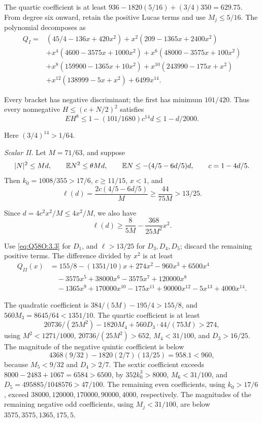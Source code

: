 The quartic coefficient is at least
\(936-1820(5/16)+(3/4)350=\allowbreak 629.75\).
From degree six onward, retain the positive Lucas terms and use \(M_j\le\allowbreak 5/16\).
The polynomial decomposes as
\[
\begin{aligned}
Q_I={}&(45/4-136x+420x^2)+x^2(209-1365x+2400x^2)\\
&+x^4(4600-3575x+1000x^2)+x^6(48000-3575x+100x^2)\\
&+x^8(159900-1365x+10x^2)+x^{10}(243990-175x+x^2)\\
&+x^{12}(138999-5x+x^2)+6499x^{14}.
\end{aligned}
\tag{Q58O.3.1}\label{eq:Q58O:3.1}
\]

Every bracket has negative discriminant; the first has minimum \(101/420\).
Thus every nonnegative \(H\le\allowbreak (c+N/2)^2\) satisfies
\[
EH^8\le1-(101/1680)c^{14}d\le1-d/2000.
\tag{Q58O.3.2}\label{eq:Q58O:3.2}
\]

Here \((3/4)^{14}>\allowbreak 1/64\).

\emph{Scalar II.}
Let \(M=\allowbreak 71/63\), and suppose
\[
|N|^2\le Md,\qquad \mathbb E N^2\le\theta Md,\qquad
\mathbb E N\le-(4/5-6d/5)d,\qquad c=1-4d/5.
\]
Then \(k_0=\allowbreak 1008/355>\allowbreak 17/6\), \(c\ge\allowbreak 11/15\), \(x<\allowbreak 1\), and
\[
\ell(d)=\frac{2c(4/5-6d/5)}M\ge\frac{44}{75M}>13/25.
\]

Since \(d=\allowbreak 4c^2x^2/M\le\allowbreak 4x^2/M\), we also have
\[
\ell(d)\ge\frac8{5M}-\frac{368}{25M^2}x^2.
\tag{Q58O.3.3}\label{eq:Q58O:3.3}
\]

Use \eqref{eq:Q58O:3.3} for \(D_1\), and \(\ell>\allowbreak 13/25\) for
\(D_3,\allowbreak D_4,\allowbreak D_5\); discard the remaining positive terms.
The difference divided by \(x^2\) is at least
\[
\begin{aligned}
Q_{II}(x)&=155/8-(1351/10)x+274x^2-960x^3+6500x^4\\
&\quad -3575x^5+38000x^6-3575x^7+120000x^8\\
&\quad -1365x^9+170000x^{10}-175x^{11}+90000x^{12}-5x^{13}+4000x^{14}.
\end{aligned}
\]

The quadratic coefficient is
\(384/(5M)-195/4>\allowbreak 155/8\), and
\(560M_3=\allowbreak 8645/64<\allowbreak 1351/10\).
The quartic coefficient is at least
\[
20736/(25M^2)-1820M_4+560D_3\cdot44/(75M)>274,
\]
using \(M^2<\allowbreak 1271/1000\), \(20736/(25M^2)>\allowbreak 652\),
\(M_4<\allowbreak 31/100\), and \(D_3>\allowbreak 16/25\).
The magnitude of the negative quintic coefficient is below
\[
4368(9/32)-1820(2/7)(13/25)=958.1<960,
\]
because \(M_5<\allowbreak 9/32\) and \(D_4>\allowbreak 2/7\).
The sextic coefficient exceeds \(8000-2483+1067=\allowbreak 6584>\allowbreak 6500\), by
\(352k_0^3>\allowbreak 8000\), \(M_6<\allowbreak 31/100\), and
\(D_5=\allowbreak 495885/1048576>\allowbreak 47/100\).
The remaining even coefficients, using \(k_0>\allowbreak 17/6\), exceed
\(38000,\allowbreak 120000,\allowbreak 170000,\allowbreak 90000,\allowbreak 4000\), respectively.
The magnitudes of the remaining negative odd coefficients, using
\(M_j<\allowbreak 31/100\), are below \(3575,\allowbreak 3575,\allowbreak 1365,\allowbreak 175,\allowbreak 5\).


